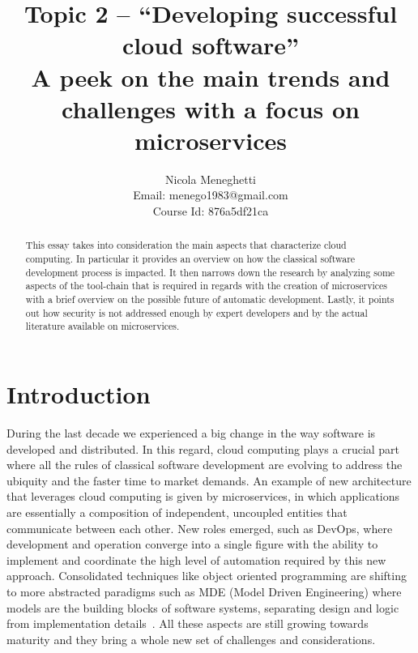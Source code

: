 \documentclass[a4paper, 10pt, conference]{ieeeconf}
\title{Topic 2 -- ``Developing successful cloud software'' \\
\large{A peek on the main trends and challenges with a focus on microservices}} %
\author{Nicola Meneghetti \\
	Email: menego1983@gmail.com \\ 
	Course Id: 876a5df21ca
}
\begin{document}
\maketitle
\thispagestyle{empty}
\pagestyle{empty}

\begin{abstract}

This essay takes into consideration the main aspects that characterize cloud computing. In particular it provides an overview on how the classical software development process is impacted. It then narrows down the research by analyzing some aspects of the tool-chain that is required in regards with the creation of microservices with a brief overview on the possible future of automatic development. Lastly, it points out how security is not addressed enough by expert developers and by the actual literature available on microservices.

\end{abstract}

\section{Introduction}

During the last decade we experienced a big change in the way software is developed and distributed. In this regard, cloud computing plays a crucial part where all the rules of classical software development are evolving to address the ubiquity and the faster time to market demands. An example of new architecture that leverages cloud computing is given by microservices, in which applications are essentially a composition of independent, uncoupled entities that communicate between each other. New roles emerged, such as DevOps, where development and operation converge into a single figure with the ability to implement and coordinate the high level of automation required by this new approach. Consolidated techniques like object oriented programming are shifting to more abstracted paradigms such as MDE (Model Driven Engineering) where models are the building blocks of software systems, separating design and logic from implementation details~\cite{overview-platforms, fuggetta2014software}. All these aspects are still growing towards maturity and they bring a whole new set of challenges and considerations.
\end{document}
